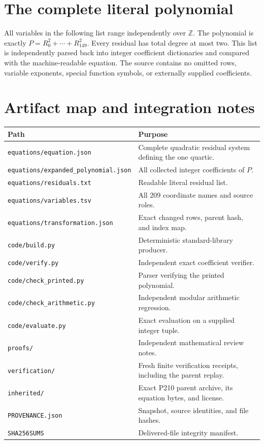 \documentclass[11pt]{article}
\theoremstyle{definition}
\theoremstyle{remark}
\newcommand{\Z}{\mathbb Z}
\begin{document}
\clearpage
\appendix
\section{The complete literal polynomial}\label{app:residuals}

All variables in the following list range independently over $\Z$.
The polynomial is exactly $P=R_0^2+\cdots+R_{149}^2$. Every residual
has total degree at most two. This list is independently parsed back into
integer coefficient dictionaries and compared with the machine-readable
equation. The source contains no omitted rows, variable exponents, special
function symbols, or externally supplied coefficients.



\clearpage
\section{Artifact map and integration notes}

\begin{longtable}{p{}p{}}
\toprule
Path & Purpose\\
\midrule
\endhead
\texttt{equations/equation.json} & Complete quadratic residual system defining the one quartic.\\
\nolinkurl{equations/expanded_polynomial.json} & All collected integer coefficients of $P$.\\
\texttt{equations/residuals.txt} & Readable literal residual list.\\
\texttt{equations/variables.tsv} & All 209 coordinate names and source roles.\\
\texttt{equations/transformation.json} & Exact changed rows, parent hash, and index map.\\
\texttt{code/build.py} & Deterministic standard-library producer.\\
\texttt{code/verify.py} & Independent exact coefficient verifier.\\
\texttt{code/check\_printed.py} & Parser verifying the printed polynomial.\\
\texttt{code/check\_arithmetic.py} & Independent modular arithmetic regression.\\
\texttt{code/evaluate.py} & Exact evaluation on a supplied integer tuple.\\
\texttt{proofs/} & Independent mathematical review notes.\\
\texttt{verification/} & Fresh finite verification receipts, including the parent replay.\\
\texttt{inherited/} & Exact P210 parent archive, its equation bytes, and license.\\
\texttt{PROVENANCE.json} & Snapshot, source identities, and file hashes.\\
\texttt{SHA256SUMS} & Delivered-file integrity manifest.\\
\bottomrule
\end{longtable}
\end{document}
